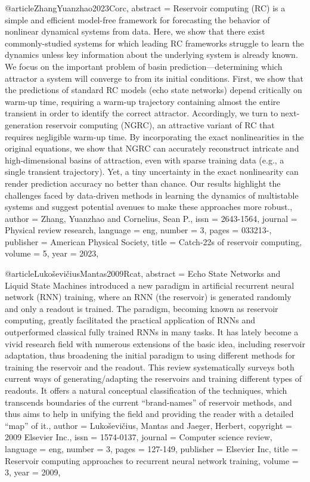 @article{ZhangYuanzhao2023Corc,
abstract = {Reservoir computing (RC) is a simple and efficient model-free framework for forecasting the behavior of nonlinear dynamical systems from data. Here, we show that there exist commonly-studied systems for which leading RC frameworks struggle to learn the dynamics unless key information about the underlying system is already known. We focus on the important problem of basin prediction—determining which attractor a system will converge to from its initial conditions. First, we show that the predictions of standard RC models (echo state networks) depend critically on warm-up time, requiring a warm-up trajectory containing almost the entire transient in order to identify the correct attractor. Accordingly, we turn to next-generation reservoir computing (NGRC), an attractive variant of RC that requires negligible warm-up time. By incorporating the exact nonlinearities in the original equations, we show that NGRC can accurately reconstruct intricate and high-dimensional basins of attraction, even with sparse training data (e.g., a single transient trajectory). Yet, a tiny uncertainty in the exact nonlinearity can render prediction accuracy no better than chance. Our results highlight the challenges faced by data-driven methods in learning the dynamics of multistable systems and suggest potential avenues to make these approaches more robust.},
author = {Zhang, Yuanzhao and Cornelius, Sean P.},
issn = {2643-1564},
journal = {Physical review research},
language = {eng},
number = {3},
pages = {033213-},
publisher = {American Physical Society},
title = {Catch-22s of reservoir computing},
volume = {5},
year = {2023},
}

@article{LukoševičiusMantas2009Rcat,
abstract = {Echo State Networks and Liquid State Machines introduced a new paradigm in artificial recurrent neural network (RNN) training, where an RNN (the
reservoir) is generated randomly and only a readout is trained. The paradigm, becoming known as
reservoir computing, greatly facilitated the practical application of RNNs and outperformed classical fully trained RNNs in many tasks. It has lately become a vivid research field with numerous extensions of the basic idea, including reservoir adaptation, thus broadening the initial paradigm to
using different methods for training the reservoir and the readout. This review systematically surveys both current ways of generating/adapting the reservoirs and training different types of readouts. It offers a natural conceptual classification of the techniques, which transcends boundaries of the current “brand-names” of reservoir methods, and thus aims to help in unifying the field and providing the reader with a detailed “map” of it.},
author = {Lukoševičius, Mantas and Jaeger, Herbert},
copyright = {2009 Elsevier Inc.},
issn = {1574-0137},
journal = {Computer science review},
language = {eng},
number = {3},
pages = {127-149},
publisher = {Elsevier Inc},
title = {Reservoir computing approaches to recurrent neural network training},
volume = {3},
year = {2009},
}

